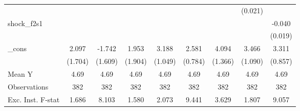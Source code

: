 {\begin{tabular}{l*{8}{c}}
            &                     &                     &                     &                     &                     &                     &     (0.021)         &                     \\
\addlinespace
shock\_f2s1  &                     &                     &                     &                     &                     &                     &                     &      -0.040\sym{**} \\
            &                     &                     &                     &                     &                     &                     &                     &     (0.019)         \\
\addlinespace
\_cons      &       2.097         &      -1.742         &       1.953         &       3.188\sym{***}&       2.581\sym{***}&       4.094\sym{***}&       3.466\sym{***}&       3.311\sym{***}\\
            &     (1.704)         &     (1.609)         &     (1.904)         &     (1.049)         &     (0.784)         &     (1.366)         &     (1.090)         &     (0.857)         \\
\midrule
Mean Y      &        4.69         &        4.69         &        4.69         &        4.69         &        4.69         &        4.69         &        4.69         &        4.69         \\
Observations&         382         &         382         &         382         &         382         &         382         &         382         &         382         &         382         \\
Exc. Inst. F-stat&       1.686         &       8.103         &       1.580         &       2.073         &       9.441         &       3.629         &       1.807         &       9.057         \\
\bottomrule
\end{tabular}
}
